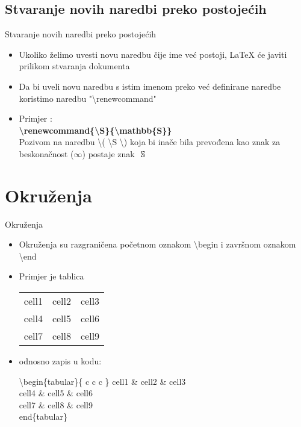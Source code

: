 \documentclass{beamer}
\begin{document}
\subsection{Stvaranje novih naredbi preko postojećih}

\begin{frame}[t]{Stvaranje novih naredbi preko postojećih}
\begin{itemize}
	\item Ukoliko želimo uvesti novu naredbu čije ime već postoji, LaTeX će javiti prilikom stvaranja dokumenta
	\item Da bi uveli novu naredbu s istim imenom preko već definirane naredbe koristimo naredbu "\textbackslash renewcommand" 
	\item Primjer : \\
			\textbf{\textbackslash renewcommand\{\textbackslash S\}\{\textbackslash mathbb\{S\}\}} \\
			Pozivom na naredbu \textbackslash ( \textbackslash S \textbackslash ) koja bi inače bila prevođena kao znak za beskonačnost ($\infty$) postaje znak 
			$\renewcommand{\S}{\mathbb{S}}$ 
										\( \S \)
										
\end{itemize}	
\end{frame}

\section{Okruženja}

\begin{frame}[t]{Okruženja}
\begin{itemize}
	\item Okruženja su razgraničena početnom oznakom \textbackslash begin i završnom oznakom \textbackslash end
	\item Primjer je tablica


\begin{tabular}{ c c c } 
  cell1 & cell2 & cell3 \\ 
  cell4 & cell5 & cell6 \\ 
  cell7 & cell8 & cell9 \\ 
 \end{tabular}

\item odnosno zapis u kodu:

\textbackslash begin\{tabular\}\{ c c c \} 
  cell1 \& cell2 \& cell3 \\ 
  cell4 \& cell5 \& cell6 \\ 
  cell7 \& cell8 \& cell9 \\ 
 end\{tabular\}


\end{itemize}
\end{frame}
\end{document}
